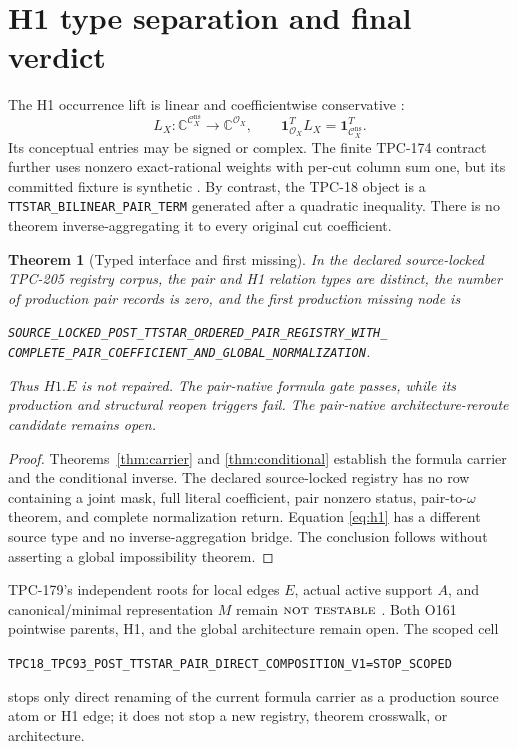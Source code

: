 \documentclass[11pt]{article}
\newtheorem{theorem}{Theorem}
\newcommand{\NT}{\textsc{not testable}}
\newcommand{\code}[1]{\nolinkurl{#1}}
\begin{document}
\section{H1 type separation and final verdict}

The H1 occurrence lift is linear and coefficientwise conservative
\citep{WangTPC143}:
\begin{equation}
 L_X:\mathbb C^{\mathcal C_X^{\mathrm{ns}}}
 \longrightarrow\mathbb C^{\mathcal O_X},
 \qquad
 \mathbf 1_{\mathcal O_X}^{T}L_X
 =\mathbf 1_{\mathcal C_X^{\mathrm{ns}}}^{T}.
 \label{eq:h1}
\end{equation}
Its conceptual entries may be signed or complex.  The finite TPC-174
contract further uses nonzero exact-rational weights with per-cut column sum
one, but its committed fixture is synthetic \citep{WangTPC174}.  By contrast,
the TPC-18 object is a
\code{TTSTAR_BILINEAR_PAIR_TERM} generated after a quadratic inequality.
There is no theorem inverse-aggregating it to every original cut
coefficient.

\begin{theorem}[Typed interface and first missing]
\label{thm:verdict}
In the declared source-locked TPC-205 registry corpus, the pair and H1
relation types are distinct, the number of production pair records is zero,
and the first production missing node is
\begin{center}
\small
\code{SOURCE_LOCKED_POST_TTSTAR_ORDERED_PAIR_REGISTRY_WITH_}\\
\code{COMPLETE_PAIR_COEFFICIENT_AND_GLOBAL_NORMALIZATION}.
\end{center}
Thus \(H1.E\) is not repaired.  The pair-native formula gate passes, while
its production and structural reopen triggers fail.  The pair-native
architecture-reroute candidate remains open.
\end{theorem}

\begin{proof}
Theorems~\ref{thm:carrier} and \ref{thm:conditional} establish the formula
carrier and the conditional inverse.  The declared source-locked registry has no row
containing a joint mask, full literal coefficient, pair nonzero status,
pair-to-\(\omega\) theorem, and complete normalization return.  Equation
\eqref{eq:h1} has a different source type and no inverse-aggregation bridge.
The conclusion follows without asserting a global impossibility theorem.
\end{proof}

TPC-179's independent roots for local edges \(E\), actual active support
\(A\), and canonical/minimal representation \(M\) remain
\(\NT\) \citep{WangTPC179}.  Both O161 pointwise parents, H1, and the global
architecture remain open.  The scoped cell
\begin{center}
\small
\code{TPC18_TPC93_POST_TTSTAR_PAIR_DIRECT_COMPOSITION_V1=STOP_SCOPED}
\end{center}
stops only direct renaming of the current formula carrier as a production
source atom or H1 edge; it does not stop a new registry, theorem crosswalk,
or architecture.
\end{document}
